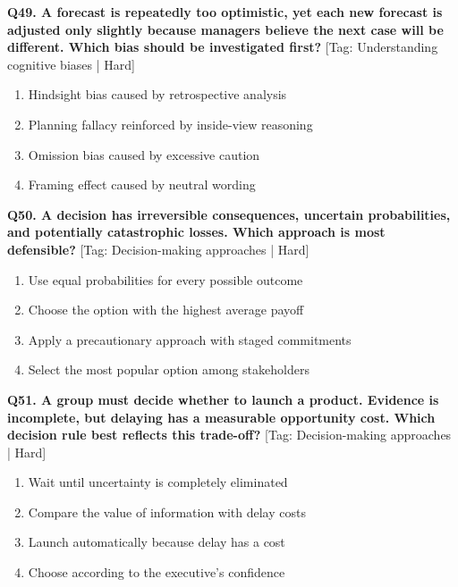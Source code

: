 \noindent\textbf{Q49. A forecast is repeatedly too optimistic, yet each new forecast is adjusted only slightly because managers believe the next case will be different. Which bias should be investigated first?} \hfill [Tag: Understanding cognitive biases | Hard]
\begin{enumerate}[label=(\alph*),topsep=2pt,itemsep=1pt,partopsep=0pt,parsep=0pt]
    \item {Hindsight bias caused by retrospective analysis}
    \item {Planning fallacy reinforced by inside-view reasoning}
    \item {Omission bias caused by excessive caution}
    \item {Framing effect caused by neutral wording}
\end{enumerate}
\vspace{2mm}

\noindent\textbf{Q50. A decision has irreversible consequences, uncertain probabilities, and potentially catastrophic losses. Which approach is most defensible?} \hfill [Tag: Decision-making approaches | Hard]
\begin{enumerate}[label=(\alph*),topsep=2pt,itemsep=1pt,partopsep=0pt,parsep=0pt]
    \item {Use equal probabilities for every possible outcome}
    \item {Choose the option with the highest average payoff}
    \item {Apply a precautionary approach with staged commitments}
    \item {Select the most popular option among stakeholders}
\end{enumerate}
\vspace{2mm}

\noindent\textbf{Q51. A group must decide whether to launch a product. Evidence is incomplete, but delaying has a measurable opportunity cost. Which decision rule best reflects this trade-off?} \hfill [Tag: Decision-making approaches | Hard]
\begin{enumerate}[label=(\alph*),topsep=2pt,itemsep=1pt,partopsep=0pt,parsep=0pt]
    \item {Wait until uncertainty is completely eliminated}
    \item {Compare the value of information with delay costs}
    \item {Launch automatically because delay has a cost}
    \item {Choose according to the executive's confidence}
\end{enumerate}
\vspace{2mm}

